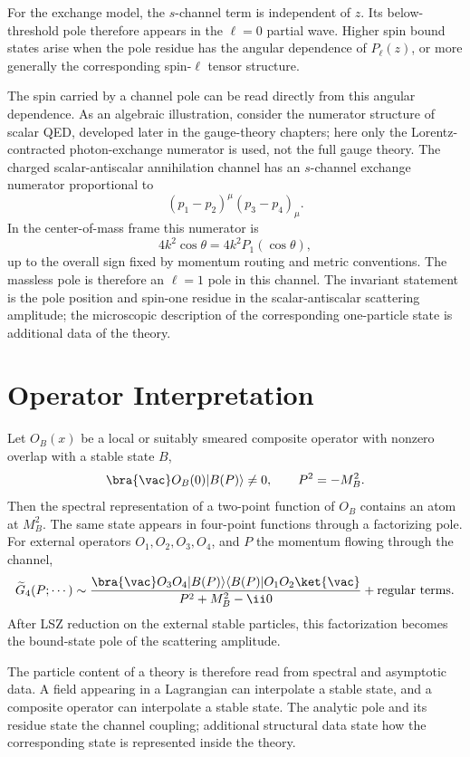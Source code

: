 For the exchange model, the \(s\)-channel term is independent of \(z\). Its
below-threshold pole therefore appears in the \(\ell=0\) partial wave. Higher
spin bound states arise when the pole residue has the angular dependence of
\(P_\ell(z)\), or more generally the corresponding spin-\(\ell\) tensor
structure.

The spin carried by a channel pole can be read directly from this angular
dependence. As an algebraic illustration, consider the numerator structure of
scalar QED, developed later in the gauge-theory chapters; here only the
Lorentz-contracted photon-exchange numerator is used, not the full gauge theory.
The charged scalar-antiscalar annihilation channel has an \(s\)-channel
exchange numerator proportional to
\[
  (p_1-p_2)^\mu(p_3-p_4)_\mu .
\]
In the center-of-mass frame this numerator is
\[
  4k^2\cos\theta
  =
  4k^2P_1(\cos\theta),
\]
up to the overall sign fixed by momentum routing and metric conventions. The
massless pole is therefore an \(\ell=1\) pole in this channel. The invariant
statement is the pole position and spin-one residue in the scalar-antiscalar
scattering amplitude; the microscopic description of the corresponding
one-particle state is additional data of the theory.

\section{Operator Interpretation}

Let \(O_B(x)\) be a local or suitably smeared composite operator with nonzero
overlap with a stable state \(B\),
\[
  \bra{\vac}O_B(0)|B(P)\rangle\ne0,
  \qquad
  P^2=-M_B^2 .
\]
Then the spectral representation of a two-point function of \(O_B\) contains
an atom at \(M_B^2\). The same state appears in four-point functions through a
factorizing pole. For external operators \(O_1,O_2,O_3,O_4\), and
\(P\) the momentum flowing through the channel,
\[
  \widetilde G_4(P;\cdots)
  \sim
  \frac{
    \bra{\vac}O_3O_4|B(P)\rangle
    \langle B(P)|O_1O_2\ket{\vac}}
       {P^2+M_B^2-\ii0}
  +\text{regular terms}.
\]
After LSZ reduction on the external stable particles, this factorization
becomes the bound-state pole of the scattering amplitude.

The particle content of a theory is therefore read from spectral and
asymptotic data. A field appearing in a Lagrangian can interpolate a stable
state, and a composite operator can interpolate a stable state. The analytic
pole and its residue state the channel coupling; additional structural data
state how the corresponding state is represented inside the theory.

